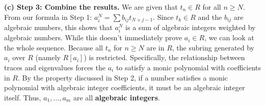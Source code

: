 \begin{solution}
\textbf{(c) Step 3: Combine the results.}
We are given that $t_n \in R$ for all $n \geq N$.
From our formula in Step 1: $a_i^N = \sum b_{ij} t_{N+j-1}$.
Since $t_k \in R$ and the $b_{ij}$ are algebraic numbers, this shows that $a_i^N$ is a sum of algebraic integers weighted by algebraic numbers.
While this doesn't immediately prove $a_i \in R$, we can look at the whole sequence. Because all $t_n$ for $n \geq N$ are in $R$, the subring generated by $a_i$ over $R$ (namely $R[a_i]$) is restricted. Specifically, the relationship between traces and eigenvalues forces the $a_i$ to satisfy a monic polynomial with coefficients in $R$.
By the property discussed in Step 2, if a number satisfies a monic polynomial with algebraic integer coefficients, it must be an algebraic integer itself.
Thus, $a_1, \dots, a_m$ are all \textbf{algebraic integers}.
\end{solution}

